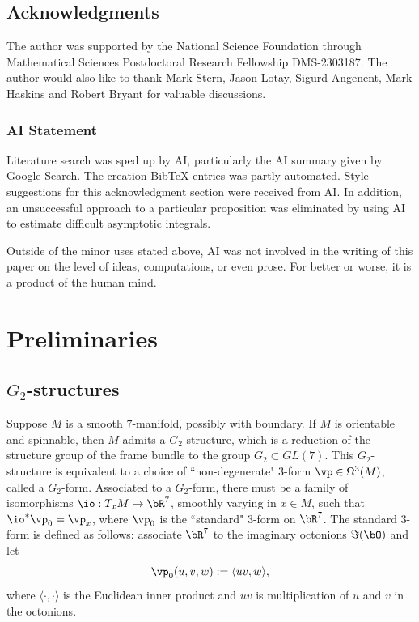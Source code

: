 \documentclass[hidelinks, 12pt, oneside, reqno]{amsart}
\begin{document}
\subsection*{Acknowledgments}

The author was supported by the National Science Foundation through Mathematical Sciences Postdoctoral Research Fellowship DMS-2303187. The author would also like to thank Mark Stern, Jason Lotay, Sigurd Angenent, Mark Haskins and Robert Bryant for valuable discussions.  

\subsubsection*{AI Statement} Literature search was sped up by AI, particularly the AI summary given by Google Search. The creation BibTeX entries was partly automated. Style suggestions for this acknowledgment section were received from AI. In addition, an unsuccessful approach to a particular proposition was eliminated by using AI to estimate difficult asymptotic integrals. 

Outside of the minor uses stated above, AI was not involved in the writing of this paper on the level of ideas, computations, or even prose. For better or worse, it is a product of the human mind. 

\section{Preliminaries}\label{section preliminaries}

\subsection{$G_2$-structures}

Suppose $M$ is a smooth $7$-manifold, possibly with boundary. If $M$ is orientable and spinnable, then $M$ admits a $G_2$-structure, which is a reduction of the structure group of the frame bundle to the group $G_2\subset GL(7)$. This $G_2$-structure is equivalent to a choice of ``non-degenerate" $3$-form $\vp \in \Omega^3(M)$, called a $G_2$-form. Associated to a $G_2$-form, there must be a family of isomorphisms $\io: T_x M \to \bR^7$, smoothly varying in $x \in M$, such that $\io^* \vp_0 = \vp_x$, where $\vp_0$ is the ``standard" $3$-form on $\bR^7$. The standard $3$-form is defined as follows: associate $\bR^7$ to the imaginary octonions $\Im(\bO)$ and let
\[
\vp_0(u,v,w) := \langle uv, w\rangle,
\]
where $\langle \cdot, \cdot \rangle$ is the Euclidean inner product and $uv$ is multiplication of $u$ and $v$ in the octonions.
\end{document}

